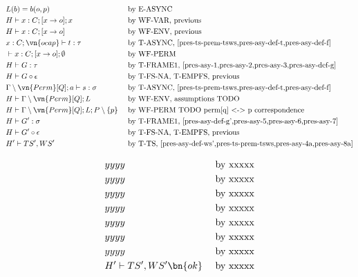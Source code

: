 \begin{alignat}{3}
    &L(b) = b(o,p)
        && \text{ by E-ASYNC}\\
    &H \vdash x : C; [x \rightarrow o]; x
        && \text{ by WF-VAR, previous}\\
    &H \vdash x : C; [x \rightarrow o] \label{pres-asy-1}
        && \text{ by WF-ENV, previous}\\
    &x : C; \vn{ocap} \vdash t : \tau \label{pres-asy-2}
        && \text{ by T-ASYNC, \cref{pres-ts-prem-tsws,pres-asy-def-t,pres-asy-def-f}}\\
    &\vdash x : C; [x \rightarrow o]; \emptyset \label{pres-asy-3}
        && \text{ by WF-PERM}\\
    &H \vdash G : \tau \label{pres-asy-4}
        && \text{ by T-FRAME1, \cref{pres-asy-1,pres-asy-2,pres-asy-3,pres-asy-def-g}}\\
    &H \vdash G \circ \epsilon \label{pres-asy-4a}
        && \text{ by T-FS-NA, T-EMPFS, previous}\\
    &\Gamma \setminus \vn{Perm}[Q]; a \vdash s : \sigma \label{pres-asy-5}
        && \text{ by T-ASYNC, \cref{pres-ts-prem-tsws,pres-asy-def-t,pres-asy-def-f}}\\
    &H \vdash \Gamma \setminus \vn{Perm}[Q]; L \label{pres-asy-6}
        && \text{ by WF-ENV, assumptions TODO}\\
    &H \vdash \Gamma \setminus \vn{Perm}[Q]; L; P \setminus \{p\} \label{pres-asy-7}
        && \text{ by WF-PERM TODO perm[q] <-> p correspondence}\\
    &H \vdash G' : \sigma \label{pres-asy-8}
        && \text{ by T-FRAME1, \cref{pres-asy-def-g',pres-asy-5,pres-asy-6,pres-asy-7}}\\
    &H \vdash G' \circ \epsilon \label{pres-asy-8a}
        && \text{ by T-FS-NA, T-EMPFS, previous}\\
    &H' \vdash TS', WS' \label{pres-asy-zzzzz}
        && \text{ by T-TS, \cref{pres-asy-def-ws',pres-ts-prem-tsws,pres-asy-4a,pres-asy-8a}}\\
\end{alignat}

\begin{alignat}{3}
    & yyyy \label{pres-asy-zzzzz}
        && \text{ by xxxxx}\\
    & yyyy \label{pres-asy-zzzzz}
        && \text{ by xxxxx}\\
    & yyyy \label{pres-asy-zzzzz}
        && \text{ by xxxxx}\\
    & yyyy \label{pres-asy-zzzzz}
        && \text{ by xxxxx}\\
    & yyyy \label{pres-asy-zzzzz}
        && \text{ by xxxxx}\\
    & yyyy \label{pres-asy-zzzzz}
        && \text{ by xxxxx}\\
    & yyyy \label{pres-asy-zzzzz}
        && \text{ by xxxxx}\\
    & H' \vdash TS', WS' \bn{ok} \label{pres-asy-zzzzz}
        && \text{ by xxxxx}\\
\end{alignat}

